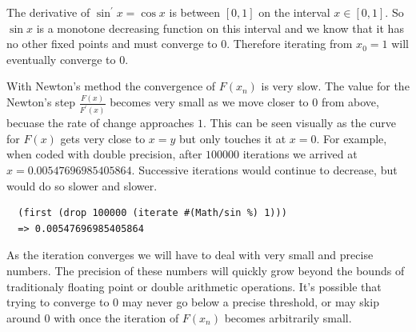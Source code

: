 {The derivative of $\sin^\prime x = \cos x$ is between $[0, 1]$ on the
interval $x \in [0,1]$. So $\sin x$ is a monotone decreasing function
on this interval and we know that it has no other fixed points and
must converge to $0$. Therefore iterating from $x_0 = 1$ will
eventually converge to $0$.

With Newton's method the convergence of $F(x_n)$ is very slow. The
value for the Newton's step $\frac{F(x)}{F^\prime(x)}$ becomes very
small as we move closer to $0$ from above, becuase the rate of change
approaches $1$. This can be seen visually
as the curve for $F(x)$ gets very close to $x = y$ but only touches it
at $x=0$. For example, when coded with double precision, after
$100000$ iterations we arrived at $x=0.00547696985405864$. Successive
iterations would continue to decrease, but would do so slower and slower.
}

\begin{verbatim}
  (first (drop 100000 (iterate #(Math/sin %) 1)))
  => 0.00547696985405864
\end{verbatim}
{\color{blue}

As the iteration converges we will have to deal with very small and
precise numbers. The precision of these numbers will quickly grow
beyond the bounds of traditionaly floating point or double arithmetic
operations. It's possible that trying to converge to $0$ may never
go below a precise threshold, or may skip around $0$ with once the
iteration of $F(x_n)$ becomes arbitrarily small.

}
